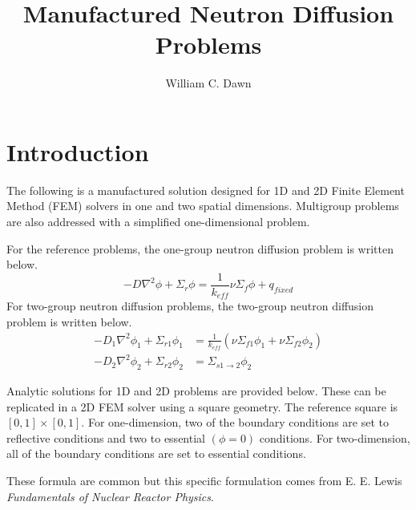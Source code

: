 \documentclass{article}
\begin{document}
\title{Manufactured Neutron Diffusion Problems}
\author{William C. Dawn}
\maketitle

\tableofcontents

\section{Introduction}
  The following is a manufactured solution designed for 1D and 2D Finite Element 
  Method (FEM) solvers in one and two spatial dimensions. Multigroup 
  problems are also addressed with a simplified one-dimensional problem.
  
  For the reference problems, the one-group neutron diffusion problem is written
  below.
  \begin{equation} \label{eq:onegroup}
    -D \nabla^2 \phi + \Sigma_r \phi =  \frac{1}{k_{eff}} \nu \Sigma_f \phi + 
      q_{fixed}
  \end{equation}
  For two-group neutron diffusion problems, the two-group neutron diffusion 
  problem is written below.
  \begin{align} 
    -D_1 \nabla^2 \phi_1 + \Sigma_{r1} \phi_1 &= \frac{1}{k_{eff}} \left(
      \nu \Sigma_{f1} \phi_1 + \nu \Sigma_{f2} \phi_2 \right) \\
    -D_2 \nabla^2 \phi_2 + \Sigma_{r2} \phi_2 &= 
      \Sigma_{s 1 \rightarrow 2} \phi_2
  \end{align}

Analytic solutions for 1D and 2D problems are provided below. These can be 
replicated in a 2D FEM solver using a square geometry. The reference square is 
$[0,1]\times[0,1]$. For one-dimension, two of the boundary conditions are set to
reflective conditions and two to essential $(\phi = 0)$ conditions. For 
two-dimension, all of the boundary conditions are set to essential conditions.

These formula are common but this specific formulation comes from E. E. Lewis
\textit{Fundamentals of Nuclear Reactor Physics}.
\end{document}
